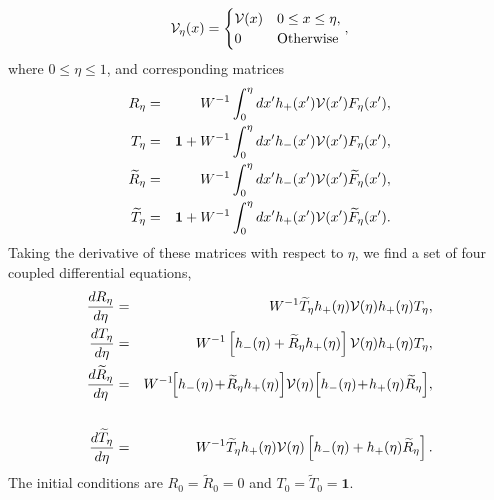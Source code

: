 \begin{equation}
	{\cal V}_{\eta} (x) =\begin{cases}
	{\cal V}(x)  & 0\leq x \leq \eta , \\ 0& \text{Otherwise}
	\end{cases},
\end{equation}
%
where $0 \le \eta \le 1$, and corresponding matrices
%
%
\begin{eqnarray}
	R_{\eta}&=& W^{-1}\int_{0}^{\eta} dx' h_{+}(x'){\cal V}(x')F_{\eta}(x'),
	\nonumber\\
	T_{\eta}&=& \mathbf{1}+W^{-1}\int_{0}^{\eta} dx' h_{-}(x'){\cal V}(x')F_{\eta}(x'),
	\nonumber\\
	\widetilde{R}_{\eta} &=& W^{-1}\int_{0}^{\eta} dx' h_{-}(x'){\cal V}(x')\widetilde{F}_{\eta}(x'),
	\nonumber\\
	\widetilde{T}_{\eta} &=& \mathbf{1}+W^{-1}\int_{0}^{\eta} dx' h_{+}(x'){\cal V}(x')\widetilde{F}_{\eta}(x').
\end{eqnarray}
%
Taking the derivative of these matrices with respect to $\eta$,
we find a set
of four coupled differential equations,
%
\begin{eqnarray}
	\frac{d R_{\eta}}{d \eta}&=& W^{-1} \widetilde{T}_{\eta} h_{+}(\eta){\cal V}(\eta)h_{+}(\eta)T_{\eta}, \\
	\frac{d T_{\eta}}{d \eta}&=& W^{-1} \left[h_{-}(\eta)+\widetilde{R}_{\eta}h_{+}(\eta)\right]{\cal V}(\eta)h_{+}(\eta)T_{\eta},\\
	\frac{d \widetilde{R}_{\eta}}{d \eta}&=& W^{-1}\!\!\left[h_{-}(\eta)\!+\!\widetilde{R}_{\eta}h_{+}(\eta)\right]\!{\cal V}(\eta)\!\left[h_{-}(\eta)\!+\!h_{+}(\eta)\widetilde{R}_{\eta}\right]\!, \nonumber\\
	\label{a20a}\\
	\frac{d \widetilde{T}_{\eta}}{d \eta}&=& W^{-1} \widetilde{T}_{\eta} h_{+}(\eta){\cal V}(\eta)\left[h_{-}(\eta)+h_{+}(\eta)\widetilde{R}_{\eta}\right].
	\label{a20b}
\end{eqnarray}
%
The initial conditions are $R_{0} = \widetilde{R}_{0}=0$ and $T_{0} = \widetilde{T}_{0}=\mathbf{1}$.


